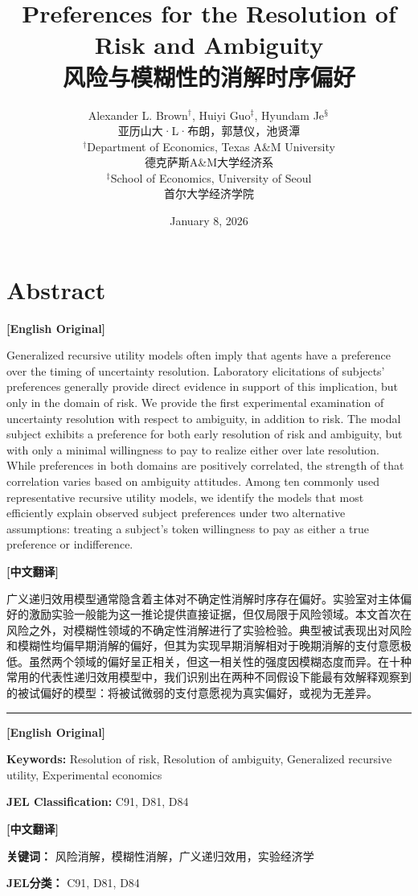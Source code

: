 \documentclass[12pt,a4paper]{ctexart}
\title{%
  \textbf{Preferences for the Resolution of Risk and Ambiguity}\\[4pt]
  {\Large\color{blue}风险与模糊性的消解时序偏好}
}
\author{%
  Alexander L. Brown$^{\dagger}$, \quad Huiyi Guo$^{\ddagger}$, \quad Hyundam Je$^{\mathsection}$\\[4pt]
  {\small\color{blue}亚历山大·L·布朗，郭慧仪，池贤潭}\\[8pt]
  $^{\dagger}$Department of Economics, Texas A\&M University\\
  {\small\color{blue}德克萨斯A\&M大学经济系}\\
  $^{\ddagger}$School of Economics, University of Seoul\\
  {\small\color{blue}首尔大学经济学院}
}
\date{January 8, 2026 \quad {\color{blue}2026年1月8日}}
\newenvironment{original}{%
  \par\medskip\noindent\textbf{[English Original]}\par\smallskip
  \color{black}\small
}{%
  \par\medskip
}
\newenvironment{translation}{%
  \par\noindent\textbf{[中文翻译]}\par\smallskip
  \color{blue}\small
}{%
  \par\bigskip
}
\theoremstyle{definition}
\theoremstyle{remark}
\begin{document}
\maketitle

\section*{Abstract}
\begin{original}
Generalized recursive utility models often imply that agents have a preference over the timing of uncertainty resolution. Laboratory elicitations of subjects' preferences generally provide direct evidence in support of this implication, but only in the domain of risk. We provide the first experimental examination of uncertainty resolution with respect to ambiguity, in addition to risk. The modal subject exhibits a preference for both early resolution of risk and ambiguity, but with only a minimal willingness to pay to realize either over late resolution. While preferences in both domains are positively correlated, the strength of that correlation varies based on ambiguity attitudes. Among ten commonly used representative recursive utility models, we identify the models that most efficiently explain observed subject preferences under two alternative assumptions: treating a subject's token willingness to pay as either a true preference or indifference.
\end{original}
\begin{translation}
广义递归效用模型通常隐含着主体对不确定性消解时序存在偏好。实验室对主体偏好的激励实验一般能为这一推论提供直接证据，但仅局限于风险领域。本文首次在风险之外，对模糊性领域的不确定性消解进行了实验检验。典型被试表现出对风险和模糊性均偏早期消解的偏好，但其为实现早期消解相对于晚期消解的支付意愿极低。虽然两个领域的偏好呈正相关，但这一相关性的强度因模糊态度而异。在十种常用的代表性递归效用模型中，我们识别出在两种不同假设下能最有效解释观察到的被试偏好的模型：将被试微弱的支付意愿视为真实偏好，或视为无差异。
\end{translation}

\vspace{12pt}
\noindent\rule{\textwidth}{0.4pt}

\begin{original}
\textbf{Keywords:} Resolution of risk, Resolution of ambiguity, Generalized recursive utility, Experimental economics

\textbf{JEL Classification:} C91, D81, D84
\end{original}
\begin{translation}
\textbf{关键词：} 风险消解，模糊性消解，广义递归效用，实验经济学

\textbf{JEL分类：} C91, D81, D84
\end{translation}
\end{document}
